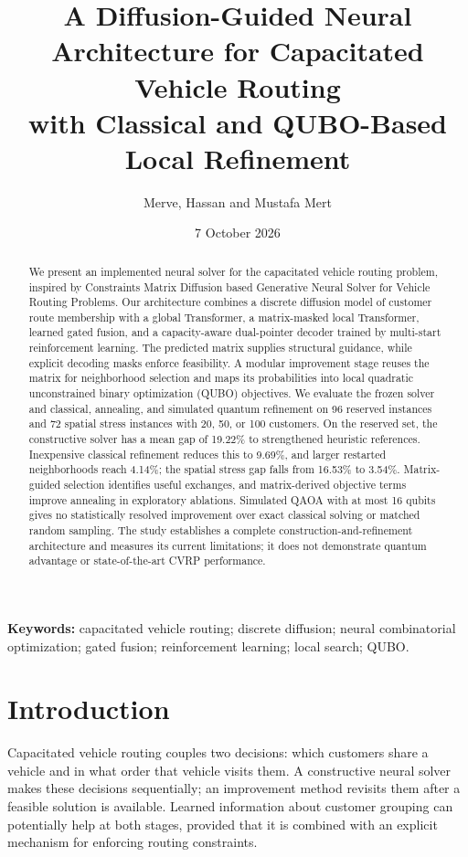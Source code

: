 \documentclass[11pt,a4paper]{article}
\title{A Diffusion-Guided Neural Architecture for Capacitated Vehicle Routing\\
with Classical and QUBO-Based Local Refinement}
\author{Merve, Hassan and Mustafa Mert}
\date{7 October 2026}
\begin{document}
\maketitle

\begin{abstract}
We present an implemented neural solver for the capacitated vehicle routing
problem, inspired by Constraints Matrix Diffusion based Generative Neural
Solver for Vehicle Routing Problems. Our architecture combines a discrete
diffusion model of customer route membership with a global Transformer,
a matrix-masked local Transformer, learned gated fusion, and a capacity-aware
dual-pointer decoder trained by multi-start reinforcement learning. The
predicted matrix supplies structural guidance, while explicit decoding masks
enforce feasibility. A modular improvement stage reuses the matrix for
neighborhood selection and maps its probabilities into local quadratic
unconstrained binary optimization (QUBO) objectives. We evaluate the frozen
solver and classical, annealing, and simulated quantum refinement on 96
reserved instances and 72 spatial stress instances with 20, 50, or 100
customers. On the reserved set, the constructive solver has a mean gap of
19.22\% to strengthened heuristic references. Inexpensive classical refinement
reduces this to 9.69\%, and larger restarted neighborhoods reach 4.14\%;
the spatial stress gap falls from 16.53\% to 3.54\%. Matrix-guided selection
identifies useful exchanges, and matrix-derived objective terms improve
annealing in exploratory ablations. Simulated QAOA with at most 16 qubits gives
no statistically resolved improvement over exact classical solving or matched
random sampling. The study establishes a complete construction-and-refinement
architecture and measures its current limitations; it does not demonstrate
quantum advantage or state-of-the-art CVRP performance.
\end{abstract}

\noindent\textbf{Keywords:} capacitated vehicle routing; discrete diffusion;
neural combinatorial optimization; gated fusion; reinforcement learning;
local search; QUBO.

\section{Introduction}

Capacitated vehicle routing couples two decisions: which customers share a
vehicle and in what order that vehicle visits them. A constructive neural
solver makes these decisions sequentially; an improvement method revisits
them after a feasible solution is available. Learned information about
customer grouping can potentially help at both stages, provided that it is
combined with an explicit mechanism for enforcing routing constraints.
\end{document}
